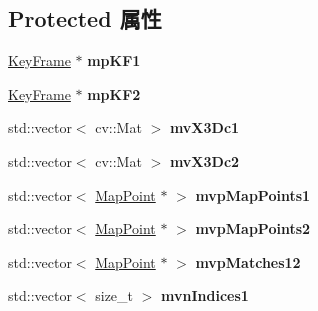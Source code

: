\subsection*{Protected 属性}
\begin{DoxyCompactItemize}
\item 
\hypertarget{classORB__SLAM2_1_1Sim3Solver_a719501a8d39a83a81a67d7334704f42c}{\hyperlink{classORB__SLAM2_1_1KeyFrame}{Key\-Frame} $\ast$ {\bfseries mp\-K\-F1}}\label{classORB__SLAM2_1_1Sim3Solver_a719501a8d39a83a81a67d7334704f42c}

\item 
\hypertarget{classORB__SLAM2_1_1Sim3Solver_abc8fbea249fc4397c901694b7ecbe2bf}{\hyperlink{classORB__SLAM2_1_1KeyFrame}{Key\-Frame} $\ast$ {\bfseries mp\-K\-F2}}\label{classORB__SLAM2_1_1Sim3Solver_abc8fbea249fc4397c901694b7ecbe2bf}

\item 
\hypertarget{classORB__SLAM2_1_1Sim3Solver_a9674b6ca24874c387ebd38b9f1a4560a}{std\-::vector$<$ cv\-::\-Mat $>$ {\bfseries mv\-X3\-Dc1}}\label{classORB__SLAM2_1_1Sim3Solver_a9674b6ca24874c387ebd38b9f1a4560a}

\item 
\hypertarget{classORB__SLAM2_1_1Sim3Solver_afa91dd6da039c45e15d7713eae0c60b7}{std\-::vector$<$ cv\-::\-Mat $>$ {\bfseries mv\-X3\-Dc2}}\label{classORB__SLAM2_1_1Sim3Solver_afa91dd6da039c45e15d7713eae0c60b7}

\item 
\hypertarget{classORB__SLAM2_1_1Sim3Solver_af4ea0c3fb99c1db31b40d4f0f0bcc749}{std\-::vector$<$ \hyperlink{classORB__SLAM2_1_1MapPoint}{Map\-Point} $\ast$ $>$ {\bfseries mvp\-Map\-Points1}}\label{classORB__SLAM2_1_1Sim3Solver_af4ea0c3fb99c1db31b40d4f0f0bcc749}

\item 
\hypertarget{classORB__SLAM2_1_1Sim3Solver_a752181b1c6efe5cc79b0204af7edf44b}{std\-::vector$<$ \hyperlink{classORB__SLAM2_1_1MapPoint}{Map\-Point} $\ast$ $>$ {\bfseries mvp\-Map\-Points2}}\label{classORB__SLAM2_1_1Sim3Solver_a752181b1c6efe5cc79b0204af7edf44b}

\item 
\hypertarget{classORB__SLAM2_1_1Sim3Solver_aa86f37922ef6499404aadc3b0a2526c7}{std\-::vector$<$ \hyperlink{classORB__SLAM2_1_1MapPoint}{Map\-Point} $\ast$ $>$ {\bfseries mvp\-Matches12}}\label{classORB__SLAM2_1_1Sim3Solver_aa86f37922ef6499404aadc3b0a2526c7}

\item 
\hypertarget{classORB__SLAM2_1_1Sim3Solver_a81ad716802ccd2a3761882a796a0205d}{std\-::vector$<$ size\-\_\-t $>$ {\bfseries mvn\-Indices1}}\label{classORB__SLAM2_1_1Sim3Solver_a81ad716802ccd2a3761882a796a0205d}


\end{DoxyCompactItemize}
